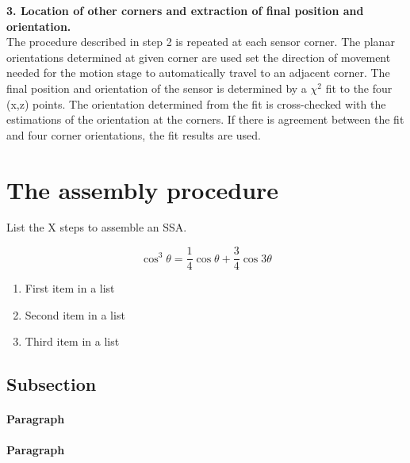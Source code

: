 \documentclass[fleqn,10pt]{SelfArx} %
\begin{document}
\textbf{3. Location of other corners and extraction of final position and orientation.}\\
The procedure described in step 2 is repeated at each sensor corner. The planar orientations determined at given corner are used set the direction of movement needed for the motion
stage to automatically travel to an adjacent corner. The final position and orientation of the sensor is determined by a $\chi^{2}$ fit to the four (x,z) points. The orientation determined from the 
fit is cross-checked with the estimations of the orientation at the corners. If there is agreement between the fit and four corner orientations, the fit results are used.

\section{The assembly procedure}

List the X steps to assemble an SSA.




\lipsum[4] %

\begin{equation}
\cos^3 \theta =\frac{1}{4}\cos\theta+\frac{3}{4}\cos 3\theta
\label{eq:refname2}
\end{equation}

\lipsum[5] %

\begin{enumerate}[noitemsep] %
\item First item in a list
\item Second item in a list
\item Third item in a list
\end{enumerate}

\subsection{Subsection}

\lipsum[6] %

\paragraph{Paragraph} \lipsum[7] %
\paragraph{Paragraph} \lipsum[8] %
\end{document}
